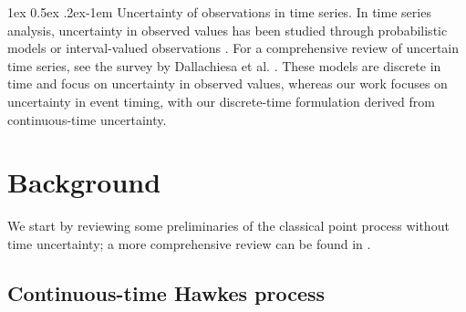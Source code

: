 \documentclass[11pt]{article}
\makeatletter
\theoremstyle{remark}
\theoremstyle{plain}
\renewcommand{\paragraph}{%
  \@startsection{paragraph}{4}%
  {\z@}{1ex \@plus 0.5ex \@minus .2ex}{-1em}%
  {\normalfont\normalsize\itshape}%
}
\makeatother
\begin{document}
\paragraph{Uncertainty of observations in time series.} In time series analysis, uncertainty in observed values has been studied through probabilistic models \cite{yang2019uncertain} or interval-valued observations \cite{maia2008forecasting}. 
For a comprehensive review of uncertain time series, see the survey by Dallachiesa et al. \cite{dallachiesa2012uncertain}. These models are discrete in time and focus on uncertainty in observed values, whereas our work focuses on uncertainty in event timing, with our discrete-time formulation derived from continuous-time uncertainty.



\section{Background}\label{Sec: background}


We start by reviewing some preliminaries of the classical point process without time uncertainty; a more comprehensive review can be found in \cite{daley2003introduction,reinhart2018review}.  

\subsection{Continuous-time Hawkes process}\label{subsec:prelim-hawkes}
\end{document}
